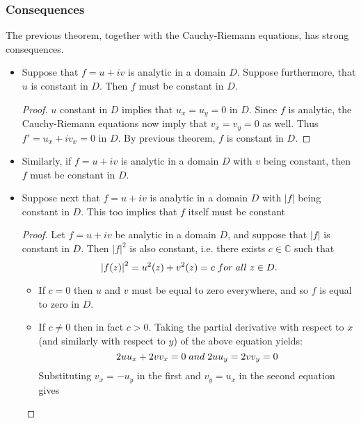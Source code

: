 \documentclass{article}
\begin{document}
\subsubsection{Consequences}
The previous theorem, together with the Cauchy-Riemann equations, has strong consequences.
\begin{itemize}
\item Suppose that $f = u + iv$ is analytic in a domain $D$. Suppose furthermore, that $u$ is constant in $D$. Then $f$ must be constant in $D$.
\begin{proof}
$u$ constant in $D$ implies that $u_x = u_y = 0$ in $D$. Since $f$ is analytic, the Cauchy-Riemann equations now imply that $v_x = v_y = 0$ as well. Thus $f' = u_x + iv_x = 0$ in $D$. By previous theorem, $f$ is constant in $D$.
\end{proof}
\item Similarly, if $f = u + iv$ is analytic in a domain $D$ with $v$ being constant, then $f$ must be constant in $D$.
\item Suppose next that $f = u + iv$ is analytic in a domain $D$ with $\left|f\right|$ being constant in $D$. This too implies that $f$ itself must be constant
\begin{proof}
Let $f = u + iv$ be analytic in a domain $D$, and suppose that $\left|f\right|$ is constant in $D$. Then $\left|f\right|^2$ is also constant, i.e. there exists $c \in \mathbb{C}$ such that
\begin{equation*}
\left|f(z)\right|^2 = u^2(z) + v^2(z) = c \hspace{0.1cm} for \hspace{0.1cm} all \hspace{0.1cm} z \in D.
\end{equation*}
\begin{itemize}
\item If $c = 0$ then $u$ and $v$ must be equal to zero everywhere, and so $f$ is equal to zero in $D$.
\item If $c \neq 0$ then in fact $c > 0$. Taking the partial derivative with respect to $x$ (and similarly with respect to $y$) of the above equation yields:
\begin{equation*}
2uu_x + 2vv_x = 0 \hspace{0.1cm} and \hspace{0.1cm} 2uu_y = 2vv_y = 0
\end{equation*}
Substituting $v_x = -u_y$ in the first and $v_y = u_x$ in the second equation gives
\begin{equation*}

\end{equation*}
\end{itemize}
\end{proof}
\end{itemize}
\end{document}
